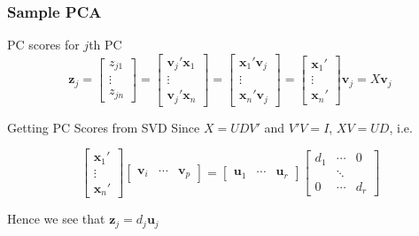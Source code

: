 \begin{frame}
  \frametitle{Sample PCA}
  \small

  \begin{block}{PC scores for $j$th PC}
    \vspace{-0.5em}
    \[
      \mathbf{z}_j = 
      \left[
        \begin{array}{c}
          z_{j1}\\ \vdots \\ z_{jn}
      \end{array}
    \right] =
      \left[
        \begin{array}{c}
          \mathbf{v}_j'\mathbf{x}_1\\
          \vdots\\
          \mathbf{v}_j'\mathbf{x}_n
      \end{array}
    \right] = 
      \left[
        \begin{array}{c}
          \mathbf{x}_1'\mathbf{v}_j\\
          \vdots\\
          \mathbf{x}_n'\mathbf{v}_j
      \end{array}
    \right] = 
      \left[
        \begin{array}{c}
          \mathbf{x}_1'\\
          \vdots\\
          \mathbf{x}_n'
      \end{array}
    \right]\mathbf{v}_j = X\mathbf{v}_j
    \]
  \end{block}

  \begin{block}{Getting PC Scores from SVD}
   Since $X = UDV'$ and $V'V = I$, $XV = UD$, i.e.\

   \[
     \left[
     \begin{array}{c}
       \mathbf{x}_1'\\
       \vdots\\
       \mathbf{x}_n'
     \end{array}
   \right]
   \left[
   \begin{array}{ccc}
     \mathbf{v}_i & \cdots & \mathbf{v}_p
   \end{array}
 \right] = 
 \left[
 \begin{array}{ccc}
   \mathbf{u}_1 & \cdots & \mathbf{u}_r
 \end{array}
 \right]
 \left[
 \begin{array}{ccc}
   d_1 & \cdots & 0\\
   & \ddots  & \\
   0 & \cdots & d_r
 \end{array}
 \right]
   \]

   \vspace{0.5em}

   \alert{Hence we see that $\mathbf{z}_j = d_j \mathbf{u}_j$}

  \end{block}

  
\end{frame}
